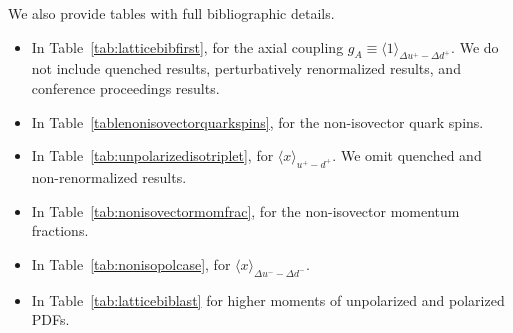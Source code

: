 We also provide tables with full bibliographic details.
%
\begin{itemize}
%
\item In Table~\ref{tab:latticebibfirst}, for the axial coupling 
$g_A\equiv\langle 1\rangle_{\Delta u^+-\Delta d^+}$.
%
We do not include quenched results, perturbatively renormalized results, 
and conference proceedings results.

\item In Table~\ref{tablenonisovectorquarkspins}, for the non-isovector quark 
spins.

\item In Table~\ref{tab:unpolarizedisotriplet}, for $\langle x\rangle_{u^+-d^+}$.
%
We omit quenched and non-renormalized results.

\item In Table~\ref{tab:nonisovectormomfrac}, for the non-isovector momentum 
fractions.

\item In Table~\ref{tab:nonisopolcase}, for 
$\langle x\rangle_{\Delta u^--\Delta d^-}$.

\item In Table~\ref{tab:latticebiblast} for  higher moments of unpolarized
  and polarized PDFs.

\end{itemize}

